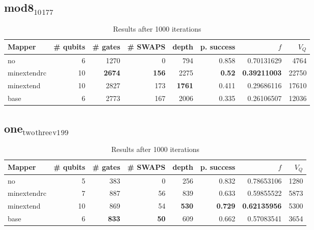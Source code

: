 \documentclass[11pt]{article}
\begin{document}
\subsection{mod8\(_{\text{10}}\)\(_{\text{177}}\)}
\label{sec:orga82d762}
\begin{table}[H]
\caption{\label{tab:orgc32857b}
Results after 1000 iterations}
\centering
\small
\begin{tabular}{lrrrrrrr}
\hline
Mapper & \# qubits & \# gates & \# SWAPS & depth & p. success & \(f\) & \(V_Q\)\\
\hline
no & 6 & 1270 & 0 & 794 & 0.858 & 0.70131629 & 4764\\
\hline
minextendrc & 10 & \textbf{2674} & \textbf{156} & 2275 & \textbf{0.52} & \textbf{0.39211003} & 22750\\
minextend & 10 & 2827 & 173 & \textbf{1761} & 0.411 & 0.29686116 & 17610\\
base & 6 & 2773 & 167 & 2006 & 0.335 & 0.26106507 & 12036\\
\hline
\end{tabular}
\end{table}
\subsection{one\(_{\text{two}}\)\(_{\text{three}}\)\(_{\text{v1}}\)\(_{\text{99}}\)}
\label{sec:org383a20e}
\begin{table}[H]
\caption{\label{tab:org2bb6026}
Results after 1000 iterations}
\centering
\small
\begin{tabular}{lrrrrrrr}
\hline
Mapper & \# qubits & \# gates & \# SWAPS & depth & p. success & \(f\) & \(V_Q\)\\
\hline
no & 5 & 383 & 0 & 256 & 0.832 & 0.78653106 & 1280\\
\hline
minextendrc & 7 & 887 & 56 & 839 & 0.633 & 0.59855522 & 5873\\
minextend & 10 & 869 & 54 & \textbf{530} & \textbf{0.729} & \textbf{0.62135956} & 5300\\
base & 6 & \textbf{833} & \textbf{50} & 609 & 0.662 & 0.57083541 & 3654\\
\hline
\end{tabular}
\end{table}
\end{document}
